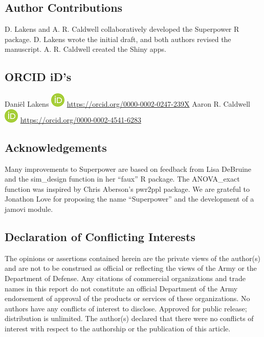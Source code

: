 \documentclass[,man,floatsintext]{apa6}
\begin{document}
\hypertarget{author-contributions}{%
\subsection{Author Contributions}\label{author-contributions}}

D. Lakens and A. R. Caldwell collaboratively developed the Superpower R package. D. Lakens wrote the initial draft, and both authors revised the manuscript. A. R. Caldwell created the Shiny apps.

\hypertarget{orcid-ids}{%
\subsection{ORCID iD's}\label{orcid-ids}}

Daniël Lakens \includegraphics{screenshots/orcid.png} \url{https://orcid.org/0000-0002-0247-239X}
Aaron R. Caldwell \includegraphics{screenshots/orcid.png} \url{https://orcid.org/0000-0002-4541-6283}

\hypertarget{acknowledgements}{%
\subsection{Acknowledgements}\label{acknowledgements}}

Many improvements to Superpower are based on feedback from Lisa DeBruine and the sim\_design function in her \enquote{faux} R package. The ANOVA\_exact function was inspired by Chris Aberson's pwr2ppl package. We are grateful to Jonathon Love for proposing the name \enquote{Superpower} and the development of a jamovi module.

\hypertarget{declaration-of-conflicting-interests}{%
\subsection{Declaration of Conflicting Interests}\label{declaration-of-conflicting-interests}}

The opinions or assertions contained herein are the private views of the author(s) and are not to be construed as official or reflecting the views of the Army or the Department of Defense. Any citations of commercial organizations and trade names in this report do not constitute an official Department of the Army endorsement of approval of the products or services of these organizations. No authors have any conflicts of interest to disclose. Approved for public release; distribution is unlimited. The author(s) declared that there were no conflicts of interest with respect to the authorship or the publication of this article.
\end{document}
